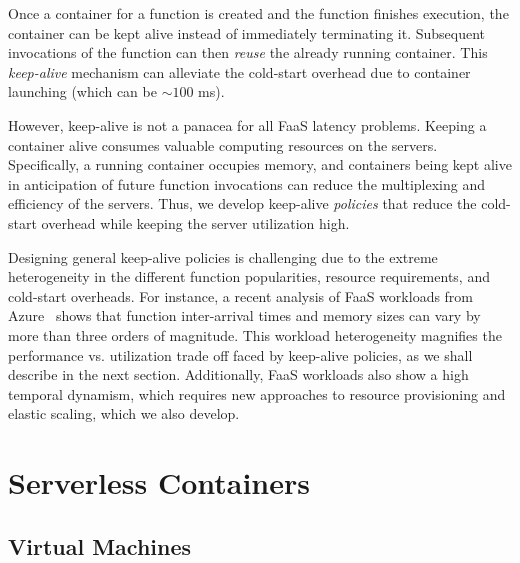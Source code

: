 Once a container for a function is created and the function finishes execution, the container can be kept alive instead of immediately terminating it. 
Subsequent invocations of the function can then \emph{reuse} the already running container.
This \emph{keep-alive} mechanism can alleviate the cold-start overhead due to container launching (which can be $\sim 100$ ms). %



However, keep-alive is not a panacea for all FaaS latency problems. 
Keeping a container alive consumes valuable computing resources on the servers. %
Specifically, a running container occupies memory, and  containers being kept alive in anticipation of future function invocations can reduce the multiplexing and efficiency of the servers. 
Thus, we develop keep-alive \emph{policies} that reduce the cold-start overhead while keeping the server utilization high.
%

Designing general keep-alive policies is challenging due to the extreme heterogeneity in the different function popularities, resource requirements, and cold-start overheads.
For instance, a recent analysis of FaaS workloads from Azure~\cite{shahrad_serverless_2020} shows that function inter-arrival times and memory sizes can vary by more than three orders of magnitude. 
%
This workload heterogeneity magnifies the performance vs. utilization trade off faced by keep-alive policies, as we shall describe in the next section. 
Additionally, FaaS workloads also show a high temporal dynamism, which requires new approaches to resource provisioning and elastic scaling, which we also develop. 

\section{Serverless Containers}
\label{sec:virtualization}


\subsection{Virtual Machines}


